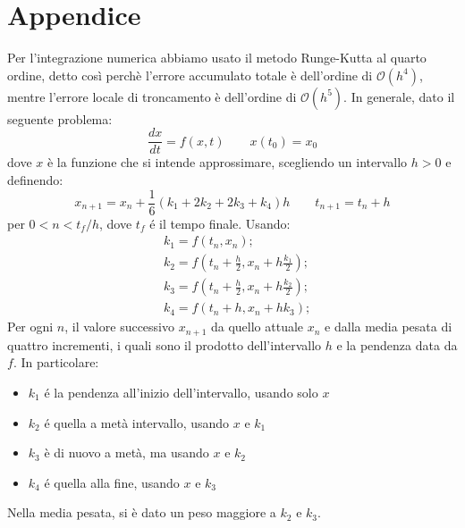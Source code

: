 \section*{Appendice}
Per l'integrazione numerica abbiamo usato il metodo Runge-Kutta al quarto ordine, detto così perchè l'errore accumulato totale è dell'ordine di $ \mathcal{O}(h^{4}) $, mentre l'errore locale di troncamento è dell'ordine di $ \mathcal{O}(h^{5}) $. 
In generale, dato il seguente problema:
\begin{equation} \tag{A1}
\frac{dx}{dt}=f(x,t)\qquad x(t_{0})=x_{0}
\end{equation}
dove $ x $ è la funzione che si intende approssimare, scegliendo un intervallo $ h>0 $ e definendo:
\begin{equation} \tag{A2}
	x_{n+1}=x_{n}+\frac{1}{6}(k_{1}+2k_{2}+2k_{3}+k_{4})h \qquad t_{n+1}=t_{n}+h
\end{equation}
per $ 0<n<t_{f}/h $, dove $ t_{f} $ é il tempo finale. Usando:
\begin{equation} \tag{A3}
	\begin{aligned}
	&k_{1}=f(t_{n}, x_{n});\\
	&k_{2}=f(t_{n}+\frac{h}{2}, x_{n}+h\frac{k_{1}}{2});\\
	&k_{3}=f(t_{n}+\frac{h}{2}, x_{n}+h\frac{k_{2}}{2});\\
	&k_{4}=f(t_{n}+h, x_{n}+hk_{3});
\end{aligned}
\end{equation}
Per ogni $ n $, il valore successivo $ x_{n+1} $ da quello attuale $ x_{n} $ e dalla media pesata di quattro incrementi, i quali sono il prodotto dell'intervallo $ h $ e la pendenza data da $ f $. In particolare:
\begin{itemize}
	\item $ k_{1} $ é la pendenza all'inizio dell'intervallo, usando solo $ x $ 
	\item $ k_{2} $ é quella a metà intervallo, usando $ x $ e $ k_{1} $
	\item $ k_{3} $ è di nuovo a metà, ma usando $ x $ e $ k_{2} $
	\item $ k_{4} $ é quella alla fine, usando $ x $ e $ k_{3} $
\end{itemize}
Nella media pesata, si è dato un peso maggiore a $ k_{2} $ e $ k_{3} $.